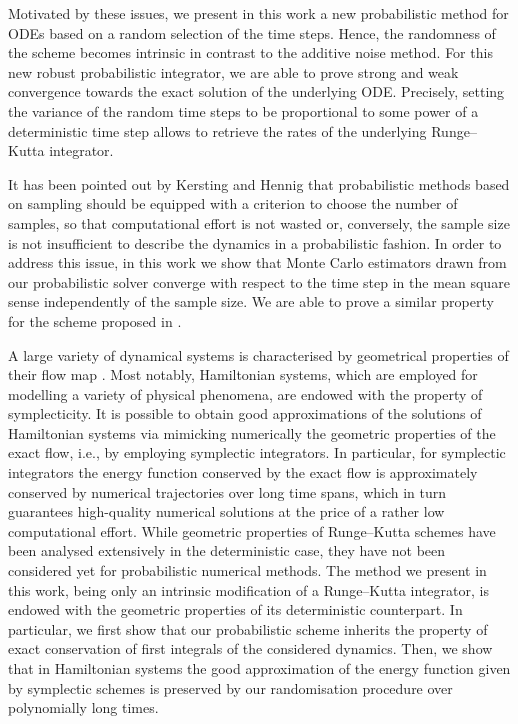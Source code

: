 \documentclass[10pt]{article}
\begin{document}
Motivated by these issues, we present in this work a new probabilistic method for ODEs based on a random selection of the time steps. Hence, the randomness of the scheme becomes intrinsic in contrast to the additive noise method. For this new robust probabilistic integrator, we are able to prove strong and weak convergence towards the exact solution of the underlying ODE. Precisely, setting the variance of the random time steps to be proportional to some power of a deterministic time step allows to retrieve the rates of the underlying Runge--Kutta integrator.

It has been pointed out by Kersting and Hennig \cite{KeH16} that probabilistic methods based on sampling should be equipped with a criterion to choose the number of samples, so that computational effort is not wasted or, conversely, the sample size is not insufficient to describe the dynamics in a probabilistic fashion. In order to address this issue, in this work we show that Monte Carlo estimators drawn from our probabilistic solver converge with respect to the time step in the mean square sense independently of the sample size. We are able to prove a similar property for the scheme proposed in \cite{CGS17}.

A large variety of dynamical systems is characterised by geometrical properties of their flow map \cite{HLW06}. Most notably, Hamiltonian systems, which are employed for modelling a variety of physical phenomena, are endowed with the property of symplecticity. It is possible to obtain good approximations of the solutions of Hamiltonian systems via mimicking numerically the geometric properties of the exact flow, i.e., by employing symplectic integrators. In particular, for symplectic integrators the energy function conserved by the exact flow is approximately conserved by numerical trajectories over long time spans, which in turn guarantees high-quality numerical solutions at the price of a rather low computational effort. While geometric properties of Runge--Kutta schemes have been analysed extensively in the deterministic case, they have not been considered yet for probabilistic numerical methods. The method we present in this work, being only an intrinsic modification of a Runge--Kutta integrator, is endowed with the geometric properties of its deterministic counterpart. In particular, we first show that our probabilistic scheme inherits the property of exact conservation of first integrals of the considered dynamics. Then, we show that in Hamiltonian systems the good approximation of the energy function given by symplectic schemes is preserved by our randomisation procedure over polynomially long times.
\end{document}
